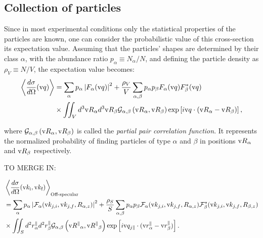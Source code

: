 \subsection{Collection of particles} \label{sec:sect:interf}

Since in most experimental conditions only the statistical properties of the particles are known, one can consider the probabilistic value of this cross-section \idest its expectation value. Assuming that the particles' shapes are determined by their class $\alpha$, with the abundance ratio $p_\alpha \equiv N_\alpha / N$, and defining the particle density as $\rho_V \equiv N/V$, the expectation value becomes:
\begin{align*}
  \left\langle \frac{d\sigma}{d\Omega}(\text{v}{q}) \right\rangle  & = \sum_\alpha p_\alpha \left\lvert F_\alpha(\text{v}{q})\right\rvert ^2 + \frac{\rho_V}{V}\sum_{\alpha,\beta} p_\alpha p_\beta F_\alpha (\text{v}{q})F_\beta^*(\text{v}{q})  \\
  & \times \iint_V d^3\text{v}{R}_\alpha d^3\text{v}{R}_\beta \mathcal{G}_{\alpha ,\beta}\left( \text{v}{R}_{\alpha} , \text{v}{R}_{\beta} \right) \exp \left[ i\text{v}{q}\cdot (\text{v}{R}_\alpha - \text{v}{R}_\beta ) \right],
\end{align*}


where $\mathcal{G}_{\alpha ,\beta}\left( \text{v}{R}_{\alpha} , \text{v}{R}_{\beta} \right)$ is called the \emph{partial pair correlation function}. It represents the normalized probability of finding particles of type $\alpha$ and $\beta$ in positions $\text{v}{R}_\alpha$ and $\text{v}{R}_\beta$ respectively.

TO MERGE IN:

\begin{align*}
  & \left\langle \frac{d\sigma}{d\Omega}(\text{v}{k}_{\text{i}},\text{v}{k}_{\text{f}}) \right\rangle_{\text{Off-specular}}  \\
  & = \sum_\alpha p_\alpha \left\lvert \mathcal{F}_\alpha(\text{v}{k}_{j,i},\text{v}{k}_{j,f}, R_{\alpha,z})\right\rvert ^2 + \frac{\rho_S}{S}\sum_{\alpha,\beta} p_\alpha p_\beta \mathcal{F}_\alpha (\text{v}{k}_{j,i},\text{v}{k}_{j,f}, R_{\alpha,z})\mathcal{F}_\beta^*(\text{v}{k}_{j,i},\text{v}{k}_{j,f}, R_{\beta,z}) \\
  & \times \iint_S d^2r_\alpha^\parallel d^2r_\beta^\parallel \mathcal{G}_{\alpha ,\beta}\left( \text{v}{R^\parallel}_{\alpha} , \text{v}{R^\parallel}_{\beta} \right) \exp \left[ i\text{v}{q}_{j\parallel}\cdot (\text{v}{r}_\alpha^\parallel - \text{v}{r}_\beta^\parallel ) \right].
\end{align*}


